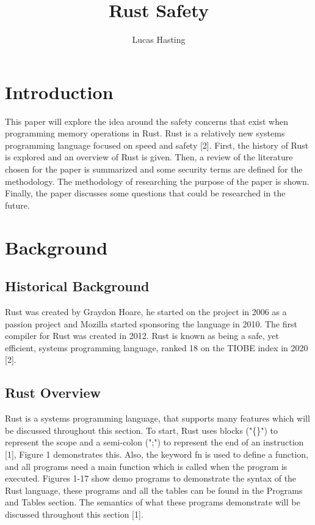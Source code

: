 \documentclass[sigconf,authorversion,nonacm]{acmart}
\title{Rust Safety}
\author{Lucas Hasting}
\affiliation{%
  \institution{University of North Alabama}
  \city{Florence, Al}
  \country{United States}}
\begin{document}
\maketitle

\section*{Introduction}
This paper will explore the idea around the safety concerns that exist when programming memory operations in Rust. Rust is a relatively new systems programming language focused on speed and safety [2]. First, the history of Rust is explored and an overview of Rust is given. Then, a review of the literature chosen for the paper is summarized and some security terms are defined for the methodology. The methodology of researching the purpose of the paper is shown. Finally, the paper discusses some questions that could be researched in the future.

\section*{Background}
\subsection*{Historical Background}
Rust was created by Graydon Hoare, he started on the project in 2006 as a passion project and Mozilla started sponsoring the language in 2010. The first compiler for Rust was created in 2012. Rust is known as being a safe, yet efficient, systems programming language, ranked 18 on the TIOBE index in 2020 [2]. 

\subsection*{Rust Overview}

Rust is a systems programming language, that supports many features which will be discussed throughout this section. To start, Rust uses blocks ("\{\}") to represent the scope and a semi-colon (";") to represent the end of an instruction [1], Figure 1 demonstrates this. Also, the keyword fn is used to define a function, and all programs need a main function which is called when the program is executed. Figures 1-17 show demo programs to demonstrate the syntax of the Rust language, these programs and all the tables can be found in the Programs and Tables section. The semantics of what these programs demonstrate will be discussed throughout this section [1]. 
\end{document}

